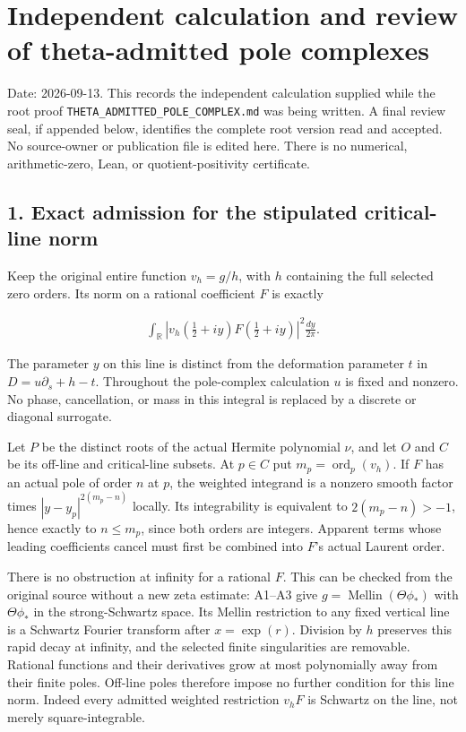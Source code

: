 \section*{Independent calculation and review of theta-admitted pole complexes}


Date: 2026-09-13. This records the independent calculation supplied while
the root proof \texttt{THETA\_\allowbreak{}ADMITTED\_\allowbreak{}POLE\_\allowbreak{}COMPLEX.md} was being written. A final
review seal, if appended below, identifies the complete root version read
and accepted. No source-owner or publication file is edited here. There
is no numerical, arithmetic-zero, Lean, or quotient-positivity certificate.


\subsection*{1. Exact admission for the stipulated critical-line norm}


Keep the original entire function \(v_h=g/h\), with \(h\) containing the full
selected zero orders. Its norm on a rational coefficient \(F\) is exactly


\[
\begin{gathered}
\int_{\mathbb R}\left|v_h\!\left(\frac12+iy\right)F\!\left(\frac12+iy\right)\right|^2\frac{dy}{2\pi}.
\end{gathered}
\]


The parameter \(y\) on this line is distinct from the deformation parameter \(t\)
in \(D=u\partial_s+h-t\). Throughout the pole-complex calculation \(u\) is fixed
and nonzero. No phase, cancellation, or mass in this integral is replaced
by a discrete or diagonal surrogate.


Let \(P\) be the distinct roots of the actual Hermite polynomial \(\nu\), and let
\(O\) and \(C\) be its off-line and critical-line subsets. At \(p\in C\) put
\(m_p=\operatorname{ord}_p(v_h)\). If \(F\) has an actual pole of order \(n\) at \(p\), the weighted
integrand is a nonzero smooth factor times \(|y-y_p|^{2(m_p-n)}\) locally.
Its integrability is equivalent to \(2(m_p-n)>-1\), hence exactly to
\(n\le m_p\), since both orders are integers. Apparent terms whose leading
coefficients cancel must first be combined into \(F\)'s actual Laurent order.


There is no obstruction at infinity for a rational \(F\). This can be checked
from the original source without a new zeta estimate: A1--A3 give
\(g=\operatorname{Mellin}(\Theta\phi_*)\) with \(\Theta\phi_*\) in the strong-Schwartz space.
Its Mellin restriction to any fixed vertical line is a Schwartz Fourier
transform after \(x=\exp(r)\). Division by \(h\) preserves this rapid decay at
infinity, and the selected finite singularities are removable. Rational
functions and their derivatives grow at most polynomially away from
their finite poles. Off-line poles therefore impose no further condition
for this line norm. Indeed every admitted weighted restriction \(v_hF\) is
Schwartz on the line, not merely square-integrable.


